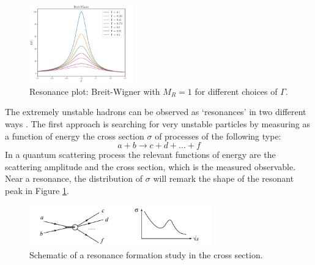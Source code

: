 \begin{figure}[H]
	\begin{center}
		\includegraphics[width=0.4\textwidth]{Python/LHC/bw.pdf}
		\caption{Resonance plot: Breit-Wigner with $M_{R}=1$ for different choices of $\Gamma$.}
		\label{fig:RESONANCE_PLOT}
	\end{center}
\end{figure}

The extremely unstable hadrons can be observed as `resonances' in two different ways \cite{bettini}. The first approach is searching for very unstable particles by measuring as a function of energy the cross section $\sigma$ of processes of the following type:
\begin{equation}
	a + b \longrightarrow c + d + \dots + f
\end{equation}
In a quantum scattering process the relevant functions of energy are the scattering amplitude and the cross section, which is the measured observable. Near a resonance, the distribution of $\sigma$ will remark the shape of the resonant peak in Figure \ref{fig:RESONANCE_PLOT}.

\begin{figure}[H]
	\centering
	\includegraphics[width=0.7\textwidth]{Images/LHC/cross_section_resonance.PNG}
	\caption{Schematic of a resonance formation study in the cross section.}
	\label{fig:CROSS_SECTION_RESONANCE}
\end{figure}

